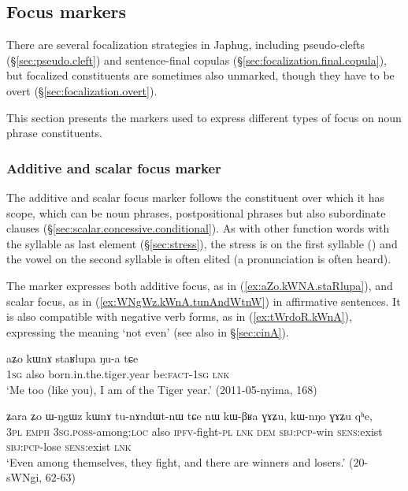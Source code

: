  \subsection{Focus markers} \label{sec:focus}
There are several focalization strategies in Japhug, including pseudo-clefts (§\ref{sec:pseudo.cleft}) and sentence-final copulas (§\ref{sec:focalization.final.copula}), but focalized constituents are sometimes also unmarked, though they have to be overt (§\ref{sec:focalization.overt}).

This section presents the markers used to express different types of focus on noun phrase constituents.


 \subsubsection{Additive and scalar focus marker  } \label{sec:kWnA}
The additive and scalar focus marker  follows the constituent over which it has scope, which can be noun phrases, postpositional phrases but also subordinate clauses (§\ref{sec:scalar.concessive.conditional}). As with other function words with the syllable  as last element (§\ref{sec:stress}), the stress is on the first syllable () and the vowel on the second syllable is often elited (a pronunciation  is often heard). 

The marker  expresses both additive focus, as in (\ref{ex:aZo.kWNA.staRlupa}), and scalar focus, as in (\ref{ex:WNgWz.kWnA.tunAndWtnW}) in affirmative sentences. It is also compatible with negative verb forms, as in (\ref{ex:tWrdoR.kWnA}), expressing the meaning `not even' (see also  in §\ref{sec:cinA}).

\begin{exe}
\ex \label{ex:aZo.kWNA.staRlupa}
\gll aʑo kɯnɤ staʁlupa ŋu-a tɕe \\
\textsc{1sg} also born.in.the.tiger.year be:\textsc{fact}-\textsc{1sg} \textsc{lnk} \\
\glt `Me too (like you), I am of the Tiger year.' (2011-05-nyima, 168)
\end{exe}

\begin{exe}
\ex \label{ex:WNgWz.kWnA.tunAndWtnW}
\gll ʑara ʑo ɯ-ŋgɯz kɯnɤ tu-nɤndɯt-nɯ tɕe nɯ kɯ-βʁa ɣɤʑu, kɯ-nŋo ɣɤʑu qʰe, \\
\textsc{3pl} \textsc{emph} \textsc{3sg}.\textsc{poss}-among:\textsc{loc} also \textsc{ipfv}-fight-\textsc{pl} \textsc{lnk} \textsc{dem} \textsc{sbj}:\textsc{pcp}-win \textsc{sens}:exist \textsc{sbj}:\textsc{pcp}-lose  \textsc{sens}:exist \textsc{lnk} \\
\glt `Even among themselves, they fight, and there are winners and losers.' (20-sWNgi, 62-63)
\end{exe}
 
